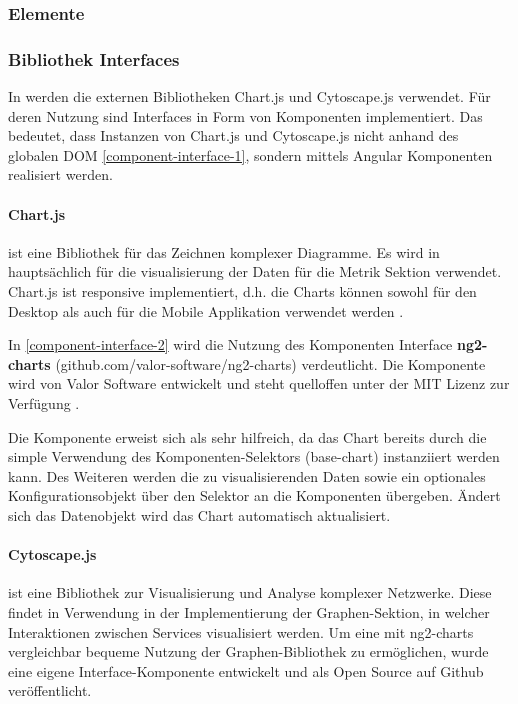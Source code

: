 \subsubsection{Elemente}

\subsubsection{Bibliothek Interfaces}

In \projectname werden die externen Bibliotheken Chart.js und Cytoscape.js verwendet.
Für deren Nutzung sind Interfaces in Form von Komponenten implementiert.
Das bedeutet, dass Instanzen von Chart.js und Cytoscape.js nicht anhand des globalen \ac{DOM} \ref{component-interface-1},
sondern mittels Angular Komponenten realisiert werden.

\newpage
\paragraph{Chart.js}
ist eine Bibliothek für das Zeichnen komplexer Diagramme.
Es wird in \projectname{} hauptsächlich für die visualisierung der Daten für die Metrik Sektion verwendet.
Chart.js ist responsive implementiert, d.h. die Charts können sowohl für den Desktop
als auch für die Mobile Applikation verwendet werden \cite{Chart80:online}.

\vspace{0.3cm}



\vspace{0.3cm}
In \ref{component-interface-2} wird die Nutzung des Komponenten Interface \textbf{ng2-charts} (github.com/valor-software/ng2-charts) verdeutlicht.
Die Komponente wird von Valor Software entwickelt und steht quelloffen unter der MIT Lizenz zur Verfügung \cite{valor6:online}.

Die Komponente erweist sich als sehr hilfreich, da das Chart bereits durch die simple Verwendung des Komponenten-Selektors (base-chart) instanziiert werden kann.
Des Weiteren werden die zu visualisierenden Daten sowie ein optionales Konfigurationsobjekt über den Selektor an die Komponenten übergeben.
Ändert sich das Datenobjekt wird das Chart automatisch aktualisiert.


\newpage
\paragraph{Cytoscape.js}
ist eine Bibliothek zur Visualisierung und Analyse komplexer Netzwerke.
Diese findet in \projectname{} Verwendung in der Implementierung der Graphen-Sektion,
in welcher Interaktionen zwischen Services visualisiert werden.
Um eine mit ng2-charts vergleichbar bequeme Nutzung der Graphen-Bibliothek zu ermöglichen,
wurde eine eigene Interface-Komponente entwickelt und als Open Source auf Github veröffentlicht.

